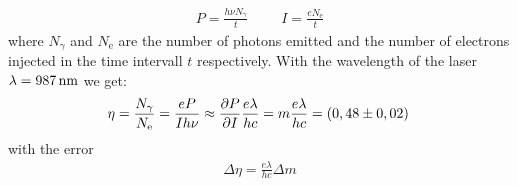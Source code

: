 \documentclass{protokoll_en}
\begin{document}
\begin{align}
P = \frac{h\nu N_\gamma}{t}\hspace{1cm} I = \frac{eN_\textrm{e}}{t}
\end{align}
where $N_\gamma$ and $N_\textrm{e}$ are the number of photons emitted and the number of electrons injected in the time intervall $t$ respectively. With the wavelength of the laser $\lambda = \unit[987]{nm}$ we get:
\begin{align}
\eta = \frac{N_\gamma}{N_\textrm{e}} = \frac{eP}{Ih\nu} \approx \frac{\partial P}{\partial I}\frac{e\lambda}{hc} = m\frac{e\lambda}{hc} = \unit[(0,48 \pm 0,02)]{}
\end{align}
with the error
\begin{align}
\Delta \eta = \frac{e\lambda}{hc}\Delta m
\end{align}
\end{document}
